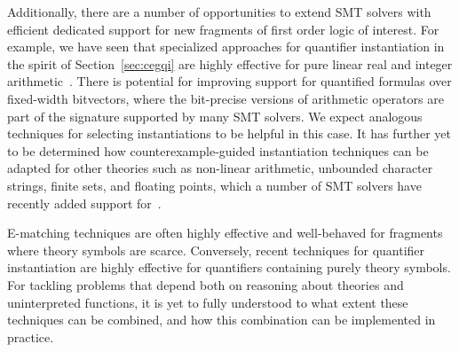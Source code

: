 \documentclass[oribibl]{llncs}
\begin{document}
Additionally, there are a number of opportunities to extend SMT solvers with efficient dedicated support for
new fragments of first order logic of interest.
For example, we have seen that specialized approaches for quantifier instantiation in the spirit of Section~\ref{sec:cegqi} 
are highly effective for pure linear real and integer arithmetic~\cite{}.
There is potential for improving support for quantified formulas over fixed-width bitvectors,
where the bit-precise versions of arithmetic operators are part of the signature supported by many SMT solvers.
We expect analogous techniques for selecting instantiations to be helpful in this case.
It has further yet to be determined how counterexample-guided instantiation techniques can be adapted
for other theories such as non-linear arithmetic, unbounded character strings, finite sets, and floating points, 
which a number of SMT solvers have recently added support for~\cite{}.

E-matching techniques
are often highly effective and well-behaved for fragments where theory symbols are scarce.
Conversely, recent techniques for quantifier instantiation are highly effective for quantifiers containing purely theory symbols.
For tackling problems that depend both on reasoning about theories and uninterpreted functions,
it is yet to fully understood to what extent these techniques can be combined,
and how this combination can be implemented in practice.



\end{document}
